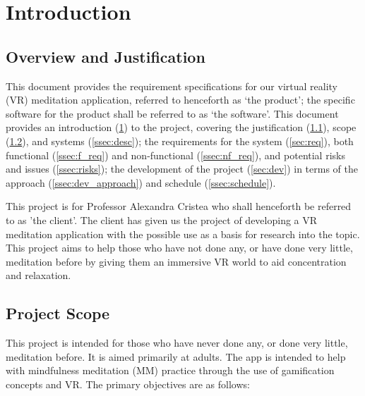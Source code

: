 \documentclass[coverpage,lineno]{../custom}
\begin{document}
\maketitle
\tableofcontents\newpage
{}


\section{Introduction}
\label{sec:intro}

\subsection{Overview and Justification}
\label{ssec:just}

This document provides the requirement specifications for our virtual reality (VR) meditation application, referred to henceforth as `the product'; the specific software for the product shall be referred to as `the software'. This document provides an introduction (\cref{sec:intro}) to the project, covering the justification (\cref{ssec:just}), scope (\cref{ssec:scope}), and systems (\cref{ssec:desc}); the requirements for the system (\cref{sec:req}), both functional (\cref{ssec:f_req}) and non-functional (\cref{ssec:nf_req}), and potential risks and issues (\cref{ssec:risks}); the development of the project (\cref{sec:dev}) in terms of the approach (\cref{ssec:dev_approach}) and schedule (\cref{ssec:schedule}).

This project is for Professor Alexandra Cristea who shall henceforth be referred to as 'the client'. The client has given us the project of developing a VR meditation application with the possible use as a basis for research into the topic. This project aims to help those who have not done any, or have done very little, meditation before by giving them an immersive VR world to aid concentration and relaxation.

\subsection{Project Scope}
\label{ssec:scope}

This project is intended for those who have never done any, or done very little, meditation before. It is aimed primarily at adults. The app is intended to help with mindfulness meditation (MM) practice through the use of gamification concepts and VR. The primary objectives are as follows:
\end{document}
